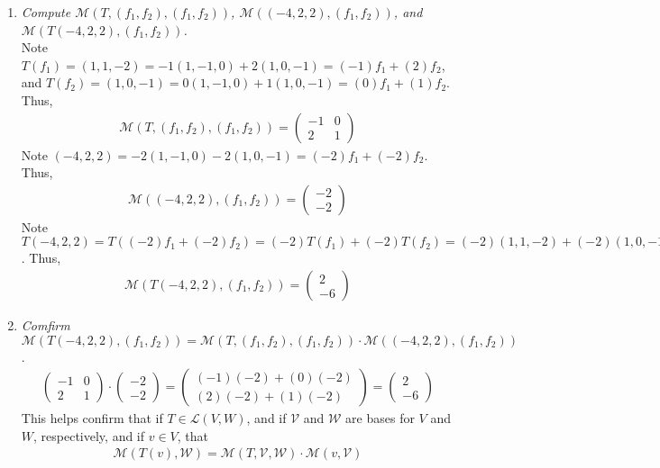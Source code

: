 \documentclass[12pt]{article}
\begin{document}
\begin{enumerate}[\ \ \ (a)\ \ ]
\item {\it Compute $\mathcal{M}(T, (f_1, f_2), (f_1, f_2))$, $\mathcal{M}((-4, 2, 2), (f_1, f_2))$, and $\mathcal{M}(T(-4, 2, 2), (f_1, f_2))$.}\\

\noindent Note $T(f_1) = (1, 1, -2) = -1(1, -1, 0)+2(1, 0, -1) = (-1)f_1 + (2)f_2$, and $T(f_2) = (1, 0 ,-1) = 0(1, -1, 0) + 1(1, 0, -1) = (0)f_1 + (1)f_2$.  Thus,
\begin{align*}
\mathcal{M}(T, (f_1, f_2), (f_1, f_2)) = \left(\begin{array}{cc}
-1 & 0 \\
2 & 1
\end{array}\right)
\end{align*}
Note $(-4, 2, 2) = -2(1, -1, 0) -2(1, 0, -1) = (-2)f_1 + (-2)f_2$.  Thus,
\begin{align*}
\mathcal{M}((-4, 2, 2), (f_1, f_2)) = \left(\begin{array}{c}
-2\\
-2
\end{array}\right)
\end{align*}
Note $T(-4, 2, 2) = T((-2)f_1 + (-2)f_2) = (-2)T(f_1) + (-2)T(f_2) = (-2)(1, 1, -2) + (-2)(1, 0, -1) = (-4, -2, 6) = 2(1, -1, 0) + (-6)(1, 0, -1) = (2)f_1 + (-6)f_2$.  Thus,
\begin{align*}
\mathcal{M}(T(-4, 2, 2), (f_1, f_2)) = \left(\begin{array}{c}
2\\
-6
\end{array}\right)
\end{align*}

\item {\it Comfirm $\mathcal{M}(T(-4, 2, 2), (f_1, f_2)) = \mathcal{M}(T, (f_1, f_2), (f_1, f_2)) \cdot \mathcal{M}((-4, 2, 2), (f_1, f_2))$}.
\begin{align*}
\left(\begin{array}{cc}
-1 & 0 \\
2 & 1
\end{array}\right)
\cdot
\left(\begin{array}{c}
-2\\
-2
\end{array}\right)
=
\left(\begin{array}{c}
(-1)(-2) + (0)(-2) \\
(2)(-2) + (1)(-2)
\end{array}\right)
=
\left(\begin{array}{c}
2 \\
-6
\end{array}\right)
\end{align*}
This helps confirm that if $T \in \mathcal{L}(V, W)$, and if $\mathcal{V}$ and $\mathcal{W}$ are bases for $V$ and $W$, respectively, and if $v \in V$, that
\begin{align*}
\mathcal{M}(T(v), \mathcal{W}) = \mathcal{M}(T, \mathcal{V}, \mathcal{W}) \cdot \mathcal{M}(v, \mathcal{V})
\end{align*}

\end{enumerate}
\end{document}
